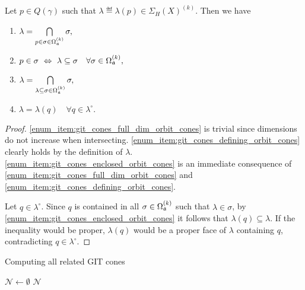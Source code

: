 \begin{lemma}
	\label{lemma:git_cones_elementary_properties}
	Let $p\in Q(\gamma)$ such that $\lambda \eqdef \lambda(p)\in\Sigma_H(X)^{(k)}$. Then we have
	\begin{enumerate}[label={\upshape(\roman*)}]
		\item $\lambda = \bigcap\limits_{p\in\sigma\in\Omega_{\mathfrak{a}}^{(k)}}\sigma,$
			\label{enum_item:git_cones_full_dim_orbit_cones}
		\item $p\in\sigma\ \Leftrightarrow\ \lambda\subseteq\sigma\quad\forall\sigma\in\Omega_\ideal^{(k)},$
			\label{enum_item:git_cones_defining_orbit_cones}
		\item $\lambda = \bigcap\limits_{\lambda\subseteq\sigma\in\Omega_{\mathfrak{a}}^{(k)}}\sigma,$
			\label{enum_item:git_cones_enclosed_orbit_cones}
		\item $\lambda = \lambda(q)\quad \forall q\in\lambda^\circ.$
			\label{enum_item:git_cones_relative_interior}
	\end{enumerate}
\end{lemma}
\begin{proof}
	\ref{enum_item:git_cones_full_dim_orbit_cones} is trivial since dimensions do not increase when intersecting. \ref{enum_item:git_cones_defining_orbit_cones} clearly holds by the definition of $\lambda$. \ref{enum_item:git_cones_enclosed_orbit_cones} is an immediate consequence of \ref{enum_item:git_cones_full_dim_orbit_cones} and \ref{enum_item:git_cones_defining_orbit_cones}.
	
	Let $q\in\lambda^\circ$. Since $q$ is contained in all $\sigma\in\Omega_{\mathfrak{a}}^{(k)}$ such that $\lambda\in\sigma$, by \ref{enum_item:git_cones_enclosed_orbit_cones} it follows that $\lambda(q)\subseteq\lambda$. If the inequality would be proper, $\lambda(q)$ would be a proper face of $\lambda$ containing $q$, contradicting $q\in\lambda^\circ$.
\end{proof}

\begin{algorithm}
	\caption{Computing all related GIT cones}
	\label{algo:compute_git_cone_neighbours}
	
	\BlankLine
	$\mathcal{N} \leftarrow \emptyset$\;
	\Return $\mathcal{N}$\;
\end{algorithm}

